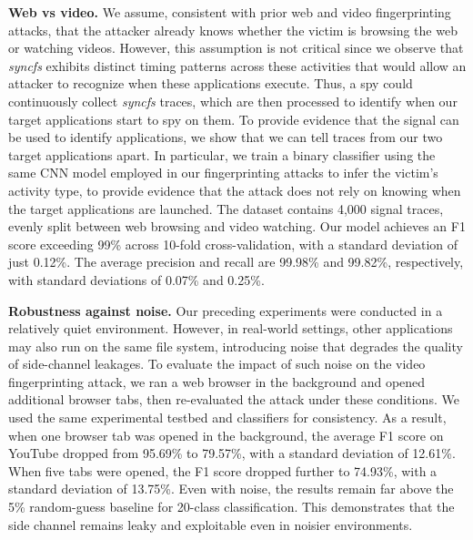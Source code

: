 \textbf{Web vs video.} We assume, consistent with prior web and video fingerprinting attacks, that the attacker already knows whether the victim is browsing the web or watching videos. However, this assumption is not critical since we observe that \textit{syncfs} exhibits distinct timing patterns across these activities that would allow an attacker to recognize when these applications execute. Thus, a spy could continuously collect \textit{syncfs} traces, which are then processed to identify when our target applications start to spy on them.  To provide evidence that the signal can be used to identify applications, we show that we can tell traces from our two target applications apart.  In particular, we train a binary classifier using the same CNN model employed in our fingerprinting attacks to infer the victim’s activity type, to provide evidence that the attack does not rely on knowing when the target applications are launched. The dataset contains 4,000 signal traces, evenly split between web browsing and video watching. Our model achieves an F1 score exceeding 99\% across 10-fold cross-validation, with a standard deviation of just 0.12\%. The average precision and recall are 99.98\% and 99.82\%, respectively, with standard deviations of 0.07\% and 0.25\%. %


\textbf{Robustness against noise.} Our preceding experiments were conducted in a relatively quiet environment. However, in real-world settings, other applications may also run on the same file system, introducing noise that degrades the quality of side-channel leakages. To evaluate the impact of such noise on the video fingerprinting attack, we ran a web browser in the background and opened additional browser tabs, then re-evaluated the attack under these conditions. We used the same experimental testbed and classifiers for consistency. As a result, when one browser tab was opened in the background, the average F1 score on YouTube dropped from 95.69\% to 79.57\%, with a standard deviation of 12.61\%. When five tabs were opened, the F1 score dropped further to 74.93\%, with a standard deviation of 13.75\%. Even with noise, the results remain far above the 5\% random-guess baseline for 20-class classification. This demonstrates that the side channel remains leaky and exploitable even in noisier environments.

